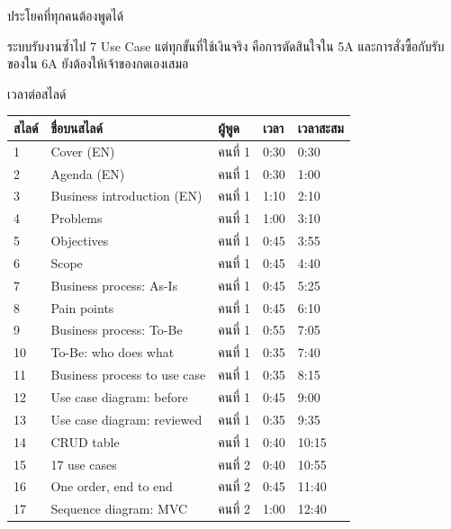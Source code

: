 \documentclass[12pt,a4paper]{article}
\begin{document}
\vspace{4pt}
{\heavy\Large ประโยคที่ทุกคนต้องพูดได้}\par
\begin{tcolorbox}[colback=ink!6,colframe=ink!6,arc=4pt]
\large ระบบรับงานซ้ำไป 7 Use Case แต่ทุกขั้นที่ใช้เงินจริง คือการตัดสินใจใน 5A และการสั่งซื้อกับรับของใน 6A ยังต้องให้เจ้าของกดเองเสมอ
\end{tcolorbox}

\clearpage
{\heavy\Large เวลาต่อสไลด์}\par
\renewcommand{\arraystretch}{0.82}
{\footnotesize
\begin{tabularx}{\linewidth}{p{0.8cm} X p{2.0cm} p{1.6cm} p{1.8cm}}
\toprule
สไลด์ & ชื่อบนสไลด์ & ผู้พูด & เวลา & เวลาสะสม\\
\midrule
1 & Cover (EN) & \textcolor{sA}{คนที่ 1} & 0:30 & 0:30\\
2 & Agenda (EN) & \textcolor{sA}{คนที่ 1} & 0:30 & 1:00\\
3 & Business introduction (EN) & \textcolor{sA}{คนที่ 1} & 1:10 & 2:10\\
4 & Problems & \textcolor{sA}{คนที่ 1} & 1:00 & 3:10\\
5 & Objectives & \textcolor{sA}{คนที่ 1} & 0:45 & 3:55\\
6 & Scope & \textcolor{sA}{คนที่ 1} & 0:45 & 4:40\\
7 & Business process: As-Is & \textcolor{sA}{คนที่ 1} & 0:45 & 5:25\\
8 & Pain points & \textcolor{sA}{คนที่ 1} & 0:45 & 6:10\\
9 & Business process: To-Be & \textcolor{sA}{คนที่ 1} & 0:55 & 7:05\\
10 & To-Be: who does what & \textcolor{sA}{คนที่ 1} & 0:35 & 7:40\\
11 & Business process to use case & \textcolor{sA}{คนที่ 1} & 0:35 & 8:15\\
12 & Use case diagram: before & \textcolor{sA}{คนที่ 1} & 0:45 & 9:00\\
13 & Use case diagram: reviewed & \textcolor{sA}{คนที่ 1} & 0:35 & 9:35\\
14 & CRUD table & \textcolor{sA}{คนที่ 1} & 0:40 & 10:15\\
\midrule
15 & 17 use cases & \textcolor{sB}{คนที่ 2} & 0:40 & 10:55\\
16 & One order, end to end & \textcolor{sB}{คนที่ 2} & 0:45 & 11:40\\
17 & Sequence diagram: MVC & \textcolor{sB}{คนที่ 2} & 1:00 & 12:40\\

\end{tabularx}}
\end{document}
